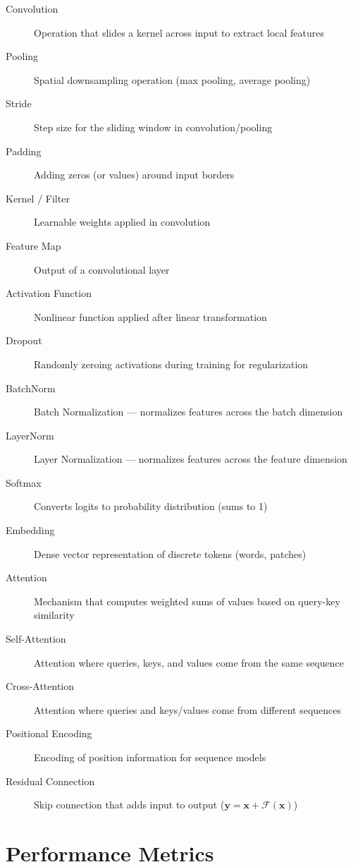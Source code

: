 \begin{description}
    \item[Convolution] Operation that slides a kernel across input to extract local features
    \item[Pooling] Spatial downsampling operation (max pooling, average pooling)
    \item[Stride] Step size for the sliding window in convolution/pooling
    \item[Padding] Adding zeros (or values) around input borders
    \item[Kernel / Filter] Learnable weights applied in convolution
    \item[Feature Map] Output of a convolutional layer
    \item[Activation Function] Nonlinear function applied after linear transformation
    \item[Dropout] Randomly zeroing activations during training for regularization
    \item[BatchNorm] Batch Normalization --- normalizes features across the batch dimension
    \item[LayerNorm] Layer Normalization --- normalizes features across the feature dimension
    \item[Softmax] Converts logits to probability distribution (sums to 1)
    \item[Embedding] Dense vector representation of discrete tokens (words, patches)
    \item[Attention] Mechanism that computes weighted sums of values based on query-key similarity
    \item[Self-Attention] Attention where queries, keys, and values come from the same sequence
    \item[Cross-Attention] Attention where queries and keys/values come from different sequences
    \item[Positional Encoding] Encoding of position information for sequence models
    \item[Residual Connection] Skip connection that adds input to output ($\mathbf{y} = \mathbf{x} + \mathcal{F}(\mathbf{x})$)
\end{description}

\section{Performance Metrics}

